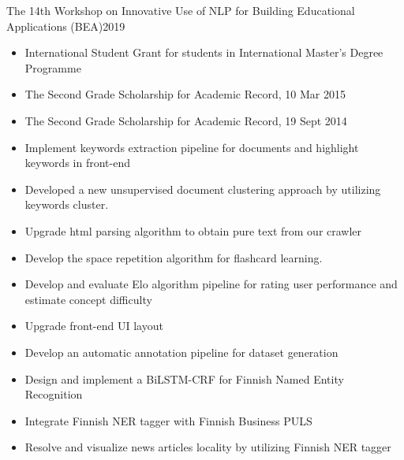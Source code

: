 {The 14th Workshop on Innovative Use of NLP for Building Educational Applications (BEA)}{2019}{}
\begin{itemize}
    \item International Student Grant for students in International Master's Degree Programme
    \item The Second Grade Scholarship for Academic Record, 10 Mar 2015
    \item The Second Grade Scholarship for Academic Record, 19 Sept 2014
\end{itemize}

\begin{itemize}
\item Implement keywords extraction pipeline for documents and highlight keywords in front-end
\item Developed a new unsupervised document clustering approach by utilizing keywords cluster.
\item Upgrade html parsing algorithm to obtain pure text from our crawler
\end{itemize}

\begin{itemize}
\item Develop the space repetition algorithm for flashcard learning.
\item Develop and evaluate Elo algorithm pipeline for rating user performance and estimate concept difficulty
\item Upgrade front-end UI layout
\end{itemize}

\begin{itemize}
\item Develop an automatic annotation pipeline for dataset generation
\item Design and implement a BiLSTM-CRF for Finnish Named Entity Recognition
\item Integrate Finnish NER tagger with Finnish Business PULS
\item Resolve and visualize news articles locality by utilizing Finnish NER tagger
\end{itemize}